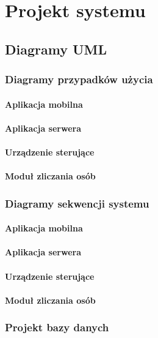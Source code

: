 % 
\newpage\section{Projekt systemu \textsl{\NazwaSys}}\label{sec:projekt}
\subsection{Diagramy UML}

	\subsubsection{Diagramy przypadków użycia}
	
		\paragraph{Aplikacja mobilna}
		\paragraph{Aplikacja serwera}
		\paragraph{Urządzenie sterujące}
		\paragraph{Moduł zliczania osób}
		
	\subsubsection{Diagramy sekwencji systemu}
	
		\paragraph{Aplikacja mobilna}
		\paragraph{Aplikacja serwera}
		\paragraph{Urządzenie sterujące}
		\paragraph{Moduł zliczania osób}
		
	\subsubsection{Projekt bazy danych} 
	
